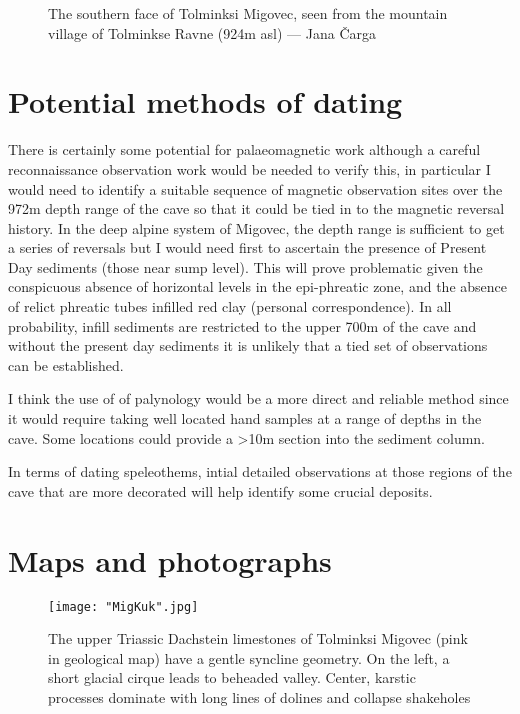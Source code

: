 \documentclass[symmetric, a4paper, 11pt]{article}
\begin{document}
\begin{figure*}[t!]
\centering
{}
\caption{The southern face of Tolminksi Migovec, seen from the mountain village of Tolminkse Ravne (924m asl) --- Jana Čarga }
\label{water chamber below helm's deep}
\end{figure*}


    
\section{Potential methods of dating}
There is certainly some potential for palaeomagnetic work although a careful reconnaissance observation work would be needed to verify this, in particular I would need to identify a suitable sequence of magnetic observation sites over the 972m depth range of the cave so that it could be tied in to the magnetic reversal history. In the deep alpine system of Migovec, the depth range is sufficient to get a series of reversals but I would need first to ascertain the presence of Present Day sediments (those near sump level). This will  prove problematic given the conspicuous absence of horizontal levels in the epi-phreatic zone, and the absence of relict phreatic tubes infilled red clay (personal correspondence). In all probability, infill sediments are restricted to the upper 700m of the cave and without the present day sediments it is unlikely that a tied set of observations can be established. 

I think the use of of palynology would be a more direct and reliable method since it would require taking well located hand samples at a range of depths in the cave. Some locations could provide a >10m section into the sediment column.

In terms of dating speleothems, intial detailed observations at those regions of the cave that are more decorated will help identify some crucial deposits. 

\section{Maps and photographs}

 \begin{figure*}[h]
    \centering
    \texttt{[image: "MigKuk".jpg]}
    \caption{The upper Triassic Dachstein limestones of Tolminksi Migovec (pink in geological map) have a gentle syncline geometry. On the left, a short glacial cirque leads to beheaded valley. Center, karstic processes dominate with long lines of dolines and collapse shakeholes}
    \end{figure*}
    
\end{document}
